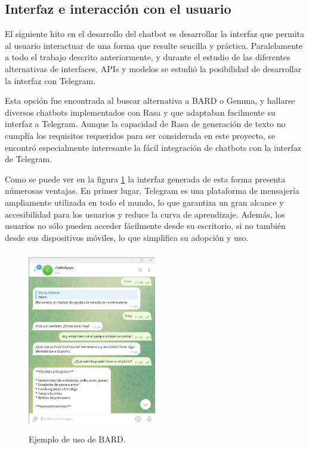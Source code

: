 \subsection{Interfaz e interacción con el usuario}
El siguiente hito en el desarrollo del chatbot es desarrollar la interfaz que permita al usuario interactuar de una forma que resulte sencilla y práctica. Paralelamente a todo el trabajo descrito anteriormente, y durante el estudio de las diferentes alternativas de interfaces, APIs y modelos se estudió la posibilidad de desarrollar la interfaz con Telegram. 

Esta opción fue encontrada al buscar alternativa a BARD o Gemma, y hallarse diversos chatbots implementados con Rasa y que adaptaban facilmente su interfaz a Telegram. Aunque la capacidad de Rasa de generación de texto no cumplía los requisitos requeridos para ser considerada en este proyecto, se encontró especialmente interesante la fácil integración de chatbots con la interfaz de Telegram. 

Como se puede ver en la figura \ref{fig:ejemploRASATELEGRAM} la interfaz generada de esta forma presenta númerosas ventajas. En primer lugar, Telegram es una plataforma de mensajería ampliamente utilizada en todo el mundo, lo que garantiza un gran alcance y accesibilidad para los usuarios y reduce la curva de aprendizaje. Además, los usuarios no sólo pueden acceder fácilmente desde su escritorio, si no también desde sus dispositivos móviles, lo que simplifica su adopción y uso.

\begin{figure}
	\centering
	\includegraphics[width=0.5\textwidth]{Imagenes/telegram1}
	\caption{ Ejemplo de uso de BARD.}
	\label{fig:ejemploRASATELEGRAM}
\end{figure}

